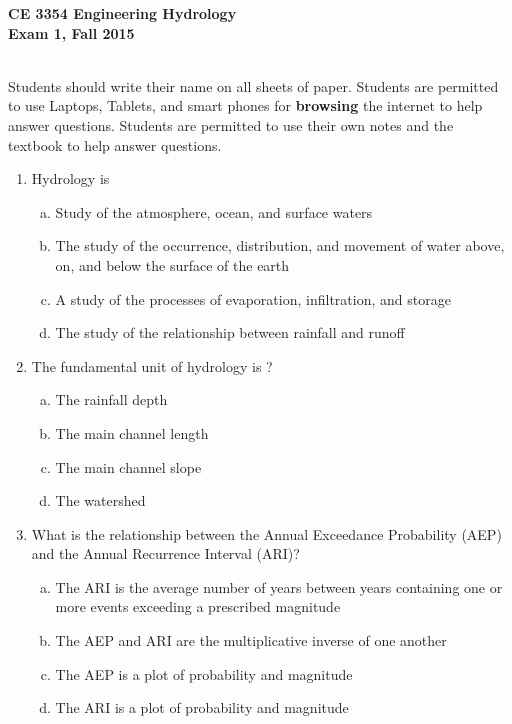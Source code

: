 \documentclass[12pt]{article}
\begin{document}
\begingroup
\begin{centering}
\textbf{CE 3354 Engineering Hydrology} \\
\textbf{Exam 1, Fall 2015}\\
\end{centering}
~\\
Students should write their name on all sheets of paper.  
Students are permitted to use Laptops, Tablets, and smart phones for \textbf{browsing} the internet to help answer questions.  Students are permitted to use their own notes and the textbook to help answer questions.
\endgroup
\begin{enumerate}
\item Hydrology is
\begin{enumerate}[a)]
\item Study of the atmosphere, ocean, and surface waters
\item The study of the occurrence, distribution, and movement of water above, on, and below the surface of the earth
\item A study of the processes of evaporation, infiltration, and storage
\item The study of the relationship between rainfall and runoff
\end{enumerate}
\item The fundamental unit of hydrology is ?
\begin{enumerate}[a)]
\item The rainfall depth
\item The main channel length
\item The main channel slope
\item The watershed 
\end{enumerate}
\item What is the relationship between the Annual Exceedance Probability (AEP) and the Annual Recurrence Interval (ARI)?
\begin{enumerate}[a)]
\item	The ARI is the average number of years between years containing one or more events exceeding a prescribed magnitude
\item	The AEP and ARI are the multiplicative inverse of one another
\item	The AEP is a plot of probability and magnitude
\item	The ARI is a plot of probability and magnitude
\end{enumerate}


\end{enumerate}
\end{document}
